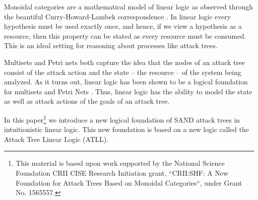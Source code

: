 Monoidal categories are a mathematical model of linear logic as
observed through the beautiful Curry-Howard-Lambek correspondence
\cite{Mellies:2009}.  In linear logic every hypothesis must be used
exactly once, and hence, if we view a hypothesis as a resource, then
this property can be stated as every resource must be consumed.  This
is an ideal setting for reasoning about processes like attack trees.

Multisets and Petri nets both capture the idea that the nodes of an
attack tree consist of the attack action and the state -- the
resource -- of the system being analyzed. As it turns out, linear
logic has been shown to be a logical foundation for multisets
\cite{Tzouvaras:1998} and Petri Nets \cite{Brown:1991}.  Thus, linear
logic has the ability to model the state as well as attack actions of
the goals of an attack tree.  

In this paper\footnote{This material is based upon work supported by
  the National Science Foundation CRII CISE Research Initiation grant,
  ``CRII:SHF: A New Foundation for Attack Trees Based on Monoidal
  Categories``, under Grant No. 1565557.} we introduce a new logical
foundation of SAND attack trees in intuitionistic linear logic.  This
new foundation is based on a new logic called the Attack Tree Linear
Logic (ATLL).

